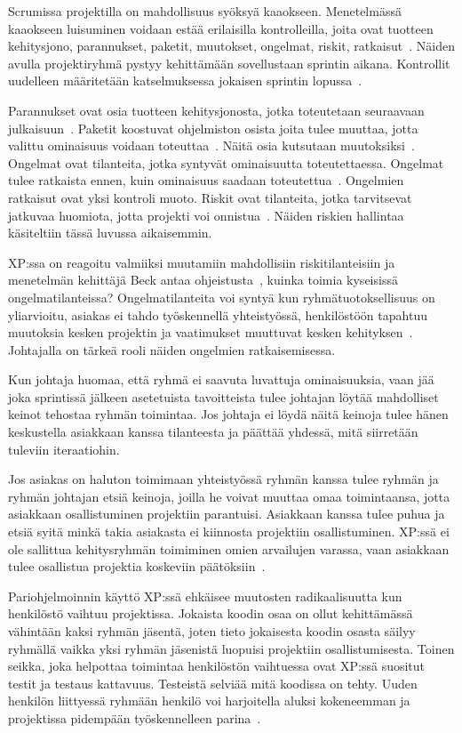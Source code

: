 \documentclass[finnish]{tktltiki2}
\theoremstyle{definition}
\theoremstyle{remark}
\begin{document}
Scrumissa projektilla on mahdollisuus syöksyä kaaokseen. Menetelmässä kaaokseen luisuminen voidaan estää erilaisilla kontrolleilla, joita ovat tuotteen kehitysjono, parannukset, paketit, muutokset, ongelmat, riskit, ratkaisut~\cite{schwaber1995scrum}. Näiden avulla projektiryhmä pystyy kehittämään sovellustaan sprintin aikana. Kontrollit uudelleen määritetään katselmuksessa jokaisen sprintin lopussa~\cite{schwaber1995scrum}.

Parannukset ovat osia tuotteen kehitysjonosta, jotka toteutetaan seuraavaan julkaisuun~\cite{schwaber1995scrum}. Paketit koostuvat ohjelmiston osista joita tulee muuttaa, jotta valittu ominaisuus voidaan toteuttaa~\cite{schwaber1995scrum}. Näitä osia kutsutaan muutoksiksi~\cite{schwaber1995scrum}. Ongelmat ovat tilanteita, jotka syntyvät ominaisuutta toteutettaessa. Ongelmat tulee ratkaista ennen, kuin ominaisuus saadaan toteutettua~\cite{schwaber1995scrum}. Ongelmien ratkaisut ovat yksi kontroli muoto. Riskit ovat tilanteita, jotka tarvitsevat jatkuvaa huomiota, jotta projekti voi onnistua~\cite{schwaber1995scrum}. Näiden riskien hallintaa käsiteltiin tässä luvussa aikaisemmin. 

XP:ssa on reagoitu valmiiksi muutamiin mahdollisiin riskitilanteisiin ja menetelmän kehittäjä Beck antaa ohjeistusta~\cite{796139}, kuinka toimia kyseisissä ongelmatilanteissa? Ongelmatilanteita voi syntyä kun ryhmätuotoksellisuus on yliarvioitu, asiakas ei tahdo työskennellä yhteistyössä, henkilöstöön tapahtuu muutoksia kesken projektin ja vaatimukset muuttuvat kesken kehityksen~\cite{796139}. Johtajalla on tärkeä rooli näiden ongelmien ratkaisemisessa.

Kun johtaja huomaa, että ryhmä ei saavuta luvattuja ominaisuuksia, vaan jää joka sprintissä jälkeen asetetuista tavoitteista tulee johtajan löytää mahdolliset keinot tehostaa ryhmän toimintaa. Jos johtaja ei löydä näitä keinoja tulee hänen keskustella asiakkaan kanssa tilanteesta ja päättää yhdessä, mitä siirretään tuleviin iteraatiohin.

Jos asiakas on haluton toimimaan yhteistyössä ryhmän kanssa tulee ryhmän ja ryhmän johtajan etsiä keinoja, joilla he voivat muuttaa omaa toimintaansa, jotta asiakkaan osallistuminen projektiin parantuisi. Asiakkaan kanssa tulee puhua ja etsiä syitä minkä takia asiakasta ei kiinnosta projektiin osallistuminen. XP:ssä ei ole sallittua kehitysryhmän toimiminen omien arvailujen varassa, vaan asiakkaan tulee osallistua projektia koskeviin päätöksiin~\cite{796139}.

Pariohjelmoinnin käyttö XP:ssä ehkäisee muutosten radikaalisuutta kun henkilöstö vaihtuu projektissa. Jokaista koodin osaa on ollut kehittämässä vähintään kaksi ryhmän jäsentä, joten tieto jokaisesta koodin osasta säilyy ryhmällä vaikka yksi ryhmän jäsenistä luopuisi projektiin osallistumisesta. Toinen seikka, joka helpottaa toimintaa henkilöstön vaihtuessa ovat XP:ssä suositut testit ja testaus kattavuus. Testeistä selviää mitä koodissa on tehty. Uuden henkilön liittyessä ryhmään henkilö voi harjoitella aluksi kokeneemman ja projektissa pidempään työskennelleen parina~\cite{796139}.
\end{document}
